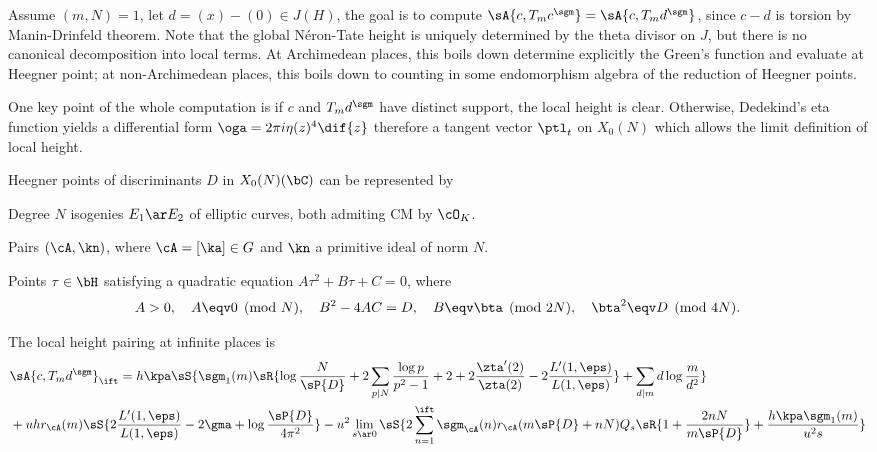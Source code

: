 \documentclass[a4paper, twoside]{article}
\begin{document}

\begin{stp}
	Assume $(m,N)=1$, let $d=(x)-(0)\in J(H)$, the goal is to compute $\sA{c,T_{m}c^{\sgm}}=\sA{c,T_{m}d^{\sgm}}$, since $c-d$ is torsion by Manin-Drinfeld theorem. Note that the global N{\'e}ron-Tate height is uniquely determined by the theta divisor on $J$, but there is no canonical decomposition into local terms. At Archimedean places, this boils down determine explicitly the Green's function and evaluate at Heegner point; at non-Archimedean places, this boils down to counting in some endomorphism algebra of the reduction of Heegner points.

	One key point of the whole computation is if $c$ and $T_{m}d^{\sgm}$ have distinct support, the local height is clear. Otherwise, Dedekind's eta function yields a differential form $\oga=2\pi i\eta(z)^{4}\dif{z}$ therefore a tangent vector $\ptl_{t}$ on $X_{0}(N)$ which allows the limit definition of local height.
\end{stp}


\begin{rcl}
	Heegner points of discriminants $D$ in $X_{0}(N)(\bC)$ can be represented by
	\begin{enr}
		\item Degree $N$ isogenies $E_{1}\ar E_{2}$ of elliptic curves, both admiting CM by $\cO_{K}$.
		\item Pairs $(\cA,\kn)$, where $\cA=[\ka]\in G$ and $\kn$ a primitive ideal of norm $N$.
		\item Points $\tau\in\bH$ satisfying a quadratic equation $A\tau^{2}+B\tau+C=0$, where
		\[
			A>0,\quad A\eqv0\pmod{N},\quad B^{2}-4AC=D,\quad B\eqv\bta\pmod{2N},\quad \bta^{2}\eqv D\pmod{4N}.
		\]
	\end{enr}
\end{rcl}

\begin{thm}[{\cite[II.4.2]{GZ1986}}]\label{thm:htinf}
	The local height pairing at infinite places is
	\begin{align*}
			 &\sA{c,T_{m}d^{\sgm}}_{\ift}=h\kpa\sS{\sgm_{1}(m)\sR{\log\frac{N}{\sP{D}}+2\sum_{p\mid N}\frac{\log p}{p^{2}-1}+2+2\frac{\zta'(2)}{\zta(2)}-2\frac{L'(1,\eps)}{L(1,\eps)}}+\sum_{d\mid m}d\log\frac{m}{d^{2}}}\\
		  &+uhr_{\cA}(m)\sS{2\frac{L'(1,\eps)}{L(1,\eps)}-2\gma+\log\frac{\sP{D}}{4\pi^{2}}}-u^{2}\lim_{s\ar0}\sS{2\sum_{n=1}^{\ift}\sgm_{\cA}(n)r_{\cA}(m\sP{D}+nN)Q_{s}\sR{1+\frac{2nN}{m\sP{D}}}+\frac{h\kpa\sgm_{1}(m)}{u^{2}s}}
	\end{align*}
\end{thm}
\end{document}
